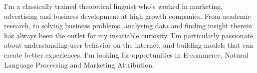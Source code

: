 

\begin{cvparagraph}

I’m a classically trained theoretical linguist who’s worked in marketing, advertising and business development at high growth companies. From academic research, to solving business problems, analysing data and finding insight therein has always been the outlet for my insatiable curiosity. I’m particularly passionate about understanding user behavior on the internet, and building models that can create better experiences. I’m looking for opportunities in E-commerce, Natural Language Processing and Marketing Attribution.
\end{cvparagraph}
